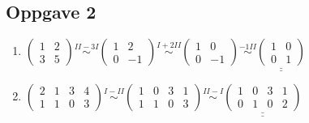 \documentclass{article}
\newcommand{\uu}[1]{\underline{\underline{#1}}}
\newcommand{\eqto}[1]{\overset{#1}{\sim}}
\begin{document}
\newpage
\subsection*{Oppgave 2}
\begin{enumerate}[A =]

\vspace{5em}

    \item $\begin{pmatrix}
        1&2\\3&5
    \end{pmatrix}
    \eqto{II-3I}
    \begin{pmatrix}
        1&2\\0&-1
    \end{pmatrix}
    \eqto{I+2II}
    \begin{pmatrix}
        1&0\\0&-1
    \end{pmatrix}
    \eqto{-1II}
    \uu{\begin{pmatrix}
        1&0\\0&1
    \end{pmatrix}}$

\vspace{5em}

    \item $\begin{pmatrix}
        2&1&3&4\\1&1&0&3
    \end{pmatrix}
    \eqto{I-II}
    \begin{pmatrix}
        1&0&3&1\\1&1&0&3
    \end{pmatrix}
    \eqto{II-I}
    \uu{\begin{pmatrix}
        1&0&3&1\\0&1&0&2
    \end{pmatrix}}$

\vspace{5em}


\end{enumerate}
\end{document}
